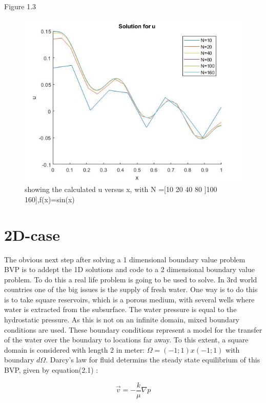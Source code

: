 \documentclass{report}
\begin{document}
\newpage

Figure 1.3

\begin{figure}[ht!]
	\centering
	\includegraphics[width=150mm]{1Dfsinx.jpg}
	\caption{showing the calculated u versus x, with N =[10 20 40 80 ]100 160],f(x)=sin(x) \label{overflow}}
\end{figure}


\chapter{2D-case}


The obvious next step after solving a 1 dimensional boundary value problem BVP is to addept the 1D solutions and code to a 2 dimensional boundary value problem. To do this a real life problem is going to be used to solve. In 3rd world countries one of the big issues is the supply of fresh water. One way is to do this is to take square reservoirs, which is a porous medium, with several wells where water is extracted from the subsurface. The water pressure is equal to the hydrostatic pressure. As this is not on an infinite domain, mixed boundary conditions are used. These boundary conditions represent a model for the transfer of the water over the boundary to locations far away. To this extent, a square domain is considered with length 2 in meter: $\Omega= (-1; 1) x (-1; 1)$ with boundary $d\Omega$. Darcy's law for fluid determins the steady state equilibrium of this BVP, given by equation(2.1) :

\begin{equation}
\vec{v}=-\frac{k}{\mu}\nabla p
\end{equation}
\medskip
\end{document}
